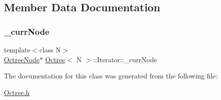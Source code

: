 \subsection{Member Data Documentation}
\mbox{\label{classOctree_1_1Iterator_ad8317eed660de125e9ecb2ea75a7e1ef}} 
\subsubsection{\texorpdfstring{\+\_\+curr\+Node}{\_currNode}}
{\footnotesize\ttfamily template$<$class N$>$ \\
\hyperlink{structOctree_1_1OctreeNode}{Octree\+Node}$\ast$ \hyperlink{classOctree}{Octree}$<$ N $>$\+::Iterator\+::\+\_\+curr\+Node\hspace{0.3cm}{\ttfamily [protected]}}



The documentation for this class was generated from the following file\+:\begin{DoxyCompactItemize}
\item 
\hyperlink{Octree_8h}{Octree.\+h}\end{DoxyCompactItemize}
